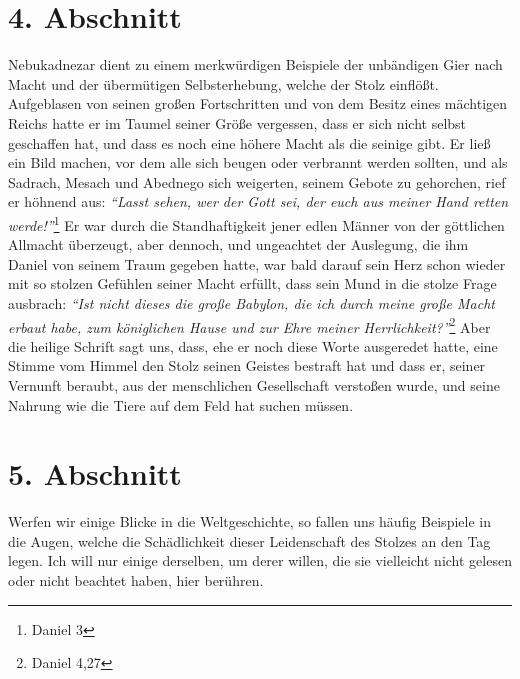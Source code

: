 \section{4. Abschnitt} \label{kap8_ab4}

Nebukadnezar dient zu einem merkwürdigen Beispiele
der unbändigen Gier nach
Macht und der übermütigen Selbsterhebung, welche der Stolz einflößt.
Aufgeblasen
von seinen großen Fortschritten und von dem Besitz eines mächtigen Reichs hatte
er im Taumel seiner Größe vergessen, dass er sich nicht selbst geschaffen hat,
und dass es noch eine höhere Macht als die seinige gibt. Er ließ ein Bild
machen,
vor dem alle sich beugen oder verbrannt werden sollten, und als
Sadrach, Mesach
und Abednego sich weigerten, seinem Gebote zu
gehorchen, rief er höhnend aus:
\textit{"`Lasst sehen, wer der Gott sei, der euch aus meiner Hand retten
werde!"'}\footnote{Daniel 3}
Er war durch die Standhaftigkeit jener edlen Männer
von der göttlichen Allmacht überzeugt, aber dennoch,
und ungeachtet der
Auslegung, die ihm Daniel von seinem Traum gegeben
hatte, war bald darauf sein
Herz schon wieder mit so stolzen Gefühlen seiner Macht erfüllt, dass sein Mund
in
die stolze Frage ausbrach:
\textit{"`Ist nicht dieses die große Babylon, die ich
durch meine große Macht erbaut habe, zum königlichen Hause und zur Ehre meiner
Herrlichkeit?"'}\footnote{Daniel 4,27}
Aber die heilige Schrift sagt uns, dass, ehe
er noch diese Worte ausgeredet hatte, eine Stimme vom Himmel den Stolz seinen
Geistes bestraft hat und dass er, seiner Vernunft beraubt, aus der menschlichen
Gesellschaft verstoßen wurde, und seine Nahrung wie die Tiere auf dem
Feld hat suchen müssen.

\section{5. Abschnitt} \label{kap8_ab5}

Werfen wir einige Blicke in die Weltgeschichte, so fallen uns häufig Beispiele
in die Augen, welche die Schädlichkeit dieser Leidenschaft des Stolzes an den
Tag legen. Ich will nur einige derselben, um derer willen, die sie
vielleicht
nicht gelesen oder nicht beachtet haben, hier berühren.


